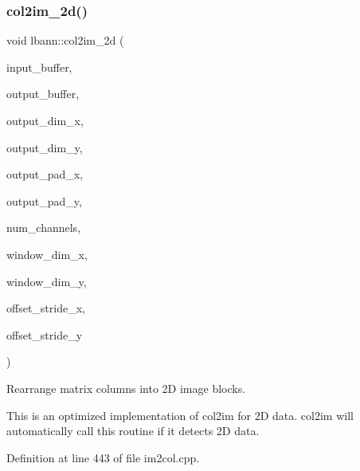 \subsubsection{\texorpdfstring{col2im\+\_\+2d()}{col2im\_2d()}}
{\footnotesize\ttfamily void lbann\+::col2im\+\_\+2d (\begin{DoxyParamCaption}\item[{const Data\+Type $\ast$\+\_\+\+\_\+restrict\+\_\+\+\_\+}]{input\+\_\+buffer,  }\item[{Data\+Type $\ast$\+\_\+\+\_\+restrict\+\_\+\+\_\+}]{output\+\_\+buffer,  }\item[{int}]{output\+\_\+dim\+\_\+x,  }\item[{int}]{output\+\_\+dim\+\_\+y,  }\item[{int}]{output\+\_\+pad\+\_\+x,  }\item[{int}]{output\+\_\+pad\+\_\+y,  }\item[{int}]{num\+\_\+channels,  }\item[{int}]{window\+\_\+dim\+\_\+x,  }\item[{int}]{window\+\_\+dim\+\_\+y,  }\item[{int}]{offset\+\_\+stride\+\_\+x,  }\item[{int}]{offset\+\_\+stride\+\_\+y }\end{DoxyParamCaption})}



Rearrange matrix columns into 2D image blocks. 

This is an optimized implementation of col2im for 2D data. col2im will automatically call this routine if it detects 2D data. 

Definition at line 443 of file im2col.\+cpp.


